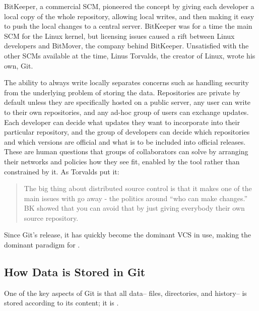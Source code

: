 BitKeeper, a commercial \gls{SCM}, pioneered the  concept by giving each developer a local copy of the whole
repository, allowing local writes, and then making it easy to push the local
changes to a central server. BitKeeper was for a time the main
\acrlong{SCM} for the Linux kernel, but licensing issues caused a rift between
Linux developers and BitMover, the company behind BitKeeper.
Unsatisfied with the other \glspl{SCM} available at the time, Linus Torvalds,
the creator of Linux, wrote his own, Git.

The ability to always write locally separates concerns such as handling security
from the underlying problem of storing the data. Repositories are private by
default unless they are specifically hosted on a public server, any user can
write to their own repositories, and any ad-hoc group of users can exchange
updates. Each developer can decide what updates they want to incorporate into
their particular repository, and the group of developers can decide which
repositories and which versions are official and what is to be included into
official releases. These are human questions that groups of collaborators can
solve by arranging their networks and policies how they see fit, enabled by the
tool rather than constrained by it. As Torvalds put it:

\blockcquote{git_10_years_interview}{The big thing about distributed source
    control is that it makes one of the main issues with  go
    away - the politics around \enquote{who can make changes.} BK
     showed that you can avoid that by just giving everybody
their own source repository. }


Since Git's release, it has quickly become the dominant \gls{VCS} in
use\cite{what_are_devs_talking_about}, making  the dominant paradigm for .

%


\subsection{How Data is Stored in Git}
\label{how-data-stored-in-git}

One of the key aspects of Git is that all data-- files, directories, and
history-- is stored according to its content; it is .

